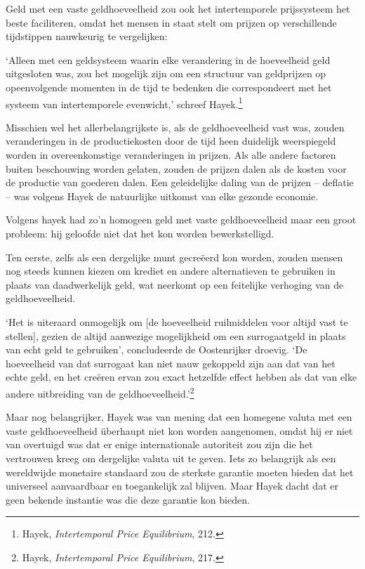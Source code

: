 \documentclass[
  a5paper,
  smalldemyvopaper,11pt,twoside,onecolumn,openright,extrafontsizes,
hidelinks]{memoir}
\begin{document}
Geld met een vaste geldhoeveelheid zou ook het intertemporele
prijssysteem het beste faciliteren, omdat het mensen in staat stelt om
prijzen op verschillende tijdstippen nauwkeurig te vergelijken:

`Alleen met een geldsysteem waarin elke verandering in de hoeveelheid
geld uitgesloten was, zou het mogelijk zijn om een structuur van
geldprijzen op opeenvolgende momenten in de tijd te bedenken die
correspondeert met het systeem van intertemporele evenwicht,' schreef
Hayek.\footnote{\hspace{0pt}Hayek, \emph{Intertemporal Price
  Equilibrium}, 212.}

Misschien wel het allerbelangrijkste is, als de geldhoeveelheid vast
was, zouden veranderingen in de productiekosten door de tijd heen
duidelijk weerspiegeld worden in overeenkomstige veranderingen in
prijzen. Als alle andere factoren buiten beschouwing worden gelaten,
zouden de prijzen dalen als de kosten voor de productie van goederen
dalen. Een geleidelijke daling van de prijzen -- deflatie -- was volgens
Hayek de natuurlijke uitkomst van elke gezonde economie.

Volgens hayek had zo'n homogeen geld met vaste geldhoeveelheid maar een
groot probleem: hij geloofde niet dat het kon worden bewerkstelligd.

Ten eerste, zelfs als een dergelijke munt gecreëerd kon worden, zouden
mensen nog steeds kunnen kiezen om krediet en andere alternatieven te
gebruiken in plaats van daadwerkelijk geld, wat neerkomt op een
feitelijke verhoging van de geldhoeveelheid.

`Het is uiteraard onmogelijk om {[}de hoeveelheid ruilmiddelen voor
altijd vast te stellen{]}, gezien de altijd aanwezige mogelijkheid om
een surrogaatgeld in plaats van echt geld te gebruiken', concludeerde de
Oostenrijker droevig. `De hoeveelheid van dat surrogaat kan niet nauw
gekoppeld zijn aan dat van het echte geld, en het creëren ervan zou
exact hetzelfde effect hebben als dat van elke andere uitbreiding van de
geldhoeveelheid.'\footnote{\hspace{0pt}Hayek, \emph{Intertemporal Price
  Equilibrium}, 217.}

Maar nog belangrijker, Hayek was van mening dat een homegene valuta met
een vaste geldhoeveelheid überhaupt niet kon worden aangenomen, omdat
hij er niet van overtuigd was dat er enige internationale autoriteit zou
zijn die het vertrouwen kreeg om dergelijke valuta uit te geven. Iets zo
belangrijk als een wereldwijde monetaire standaard zou de sterkste
garantie moeten bieden dat het universeel aanvaardbaar en toegankelijk
zal blijven. Maar Hayek dacht dat er geen bekende instantie was die deze
garantie kon bieden.
\end{document}
